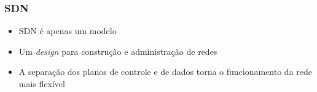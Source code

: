 %
%
\begin{frame}\frametitle{SDN}

    \begin{itemize}
        \setlength{\itemsep}{1cm}
        \item SDN é apenas um modelo
        \item Um \emph{design} para construção e administração de redes
        \item A separação dos planos de controle e de dados torna o 
              funcionamento da rede mais flexível
    \end{itemize}
\end{frame}
